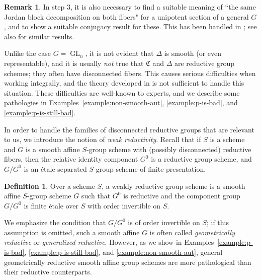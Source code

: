 \documentclass[11pt, letterpaper,english]{amsart}
\theoremstyle{plain}
\theoremstyle{definition}
\newtheorem{defn}[lem]{Definition}
\newtheorem{remark}[lem]{Remark}
\numberwithin{equation}{section}
\numberwithin{lem}{section}
\newcommand{\fC}{\mathfrak{C}}
\DeclareMathOperator{\GL}{GL}
\begin{document}
\begin{remark}
In step 3, it is also necessary to find a suitable meaning of ``the same Jordan block decomposition on both fibers" for a unipotent section of a general $G$, and to show a suitable conjugacy result for these. This has been handled in \cite{cotner}; see also \cite{Hardesty} for similar results.
\end{remark}

 Unlike the case $G = \GL_n$, it is not evident that $\Delta$ is smooth (or even representable), and it is usually \textit{not} true that $\fC$ and $\Delta$ are reductive group schemes; they often have disconnected fibers. This causes serious difficulties when working integrally, and the theory developed in \cite{sga3} is not sufficient to handle this situation. These difficulties are well-known to experts, and we describe some pathologies in Examples~\ref{example:non-smooth-aut}, \ref{example:p-is-bad}, and \ref{example:p-is-still-bad}.
 
 In order to handle the families of disconnected reductive groups that are relevant to us, we introduce the notion of \textit{weak reductivity}.  Recall \cite[Proposition 3.1.3]{conrad} that if $S$ is a scheme and $G$ is a smooth affine $S$-group scheme with (possibly disconnected) reductive fibers, then the relative identity component $G^0$ is a reductive group scheme, and $G/G^0$ is an \'{e}tale separated $S$-group scheme of finite presentation.

%
%
%
    
%
%

%
%

%

\begin{defn}
Over a scheme $S$, a weakly reductive group scheme is a smooth affine $S$-group scheme $G$ such that $G^0$ is reductive and the component group $G/G^0$ is finite \'{e}tale over $S$ with order invertible on $S$.
\end{defn}

We emphasize the condition that $G/G^0$ is of order invertible on $S$; if this assumption is omitted, such a smooth affine $G$ is often called \textit{geometrically reductive} or \textit{generalized reductive}. However, as we show in Examples~\ref{example:p-is-bad}, \ref{example:p-is-still-bad}, and \ref{example:non-smooth-aut}, general geometrically reductive smooth affine group schemes are more pathological than their reductive counterparts.
\end{document}
